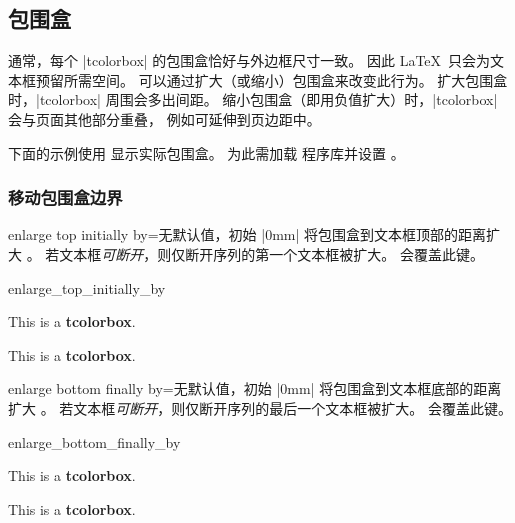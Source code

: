 \clearpage
\subsection{包围盒}
通常，每个 |tcolorbox| 的包围盒恰好与外边框尺寸一致。
因此 \LaTeX\ 只会为文本框预留所需空间。
可以通过扩大（或缩小）包围盒来改变此行为。
扩大包围盒时，|tcolorbox| 周围会多出间距。
缩小包围盒（即用负值扩大）时，|tcolorbox| 会与页面其他部分重叠，
例如可延伸到页边距中。

\begin{marker}
下面的示例使用  显示实际包围盒。
为此需加载  程序库并设置 。
\end{marker}

\subsubsection{移动包围盒边界}

\begin{docTcbKey}{enlarge top initially by}{=}{无默认值，初始 |0mm|}
  将包围盒到文本框顶部的距离扩大 。
  若文本框\emph{可断开}，则仅断开序列的第一个文本框被扩大。
   会覆盖此键。
\begin{exdispExample}{enlarge_top_initially_by}

\begin{tcolorbox}[enlarge top initially by=-5mm]
This is a \textbf{tcolorbox}.
\end{tcolorbox}
\begin{tcolorbox}[enlarge top initially by=5mm,enhanced,show bounding box]
This is a \textbf{tcolorbox}.
\end{tcolorbox}
\end{exdispExample}
\end{docTcbKey}



\begin{docTcbKey}{enlarge bottom finally by}{=}{无默认值，初始 |0mm|}
  将包围盒到文本框底部的距离扩大 。
  若文本框\emph{可断开}，则仅断开序列的最后一个文本框被扩大。
   会覆盖此键。
\begin{exdispExample}{enlarge_bottom_finally_by}

\begin{tcolorbox}[enlarge bottom finally by=5mm]
This is a \textbf{tcolorbox}.
\end{tcolorbox}
\begin{tcolorbox}[enlarge bottom finally by=-5mm,enhanced,show bounding box]
This is a \textbf{tcolorbox}.
\end{tcolorbox}
\end{exdispExample}
\end{docTcbKey}


